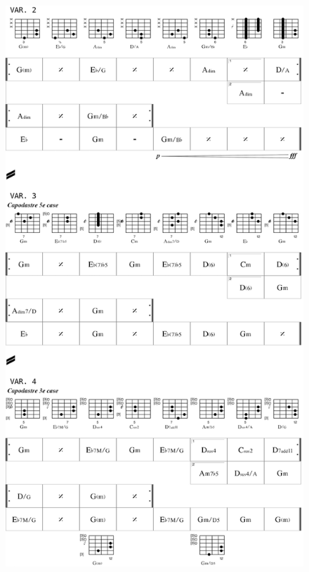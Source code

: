  \begin{figure}[H]
\begin{center}
\includegraphics[scale=0.33]{img/dlc3}
\end{center}
\end{figure}

